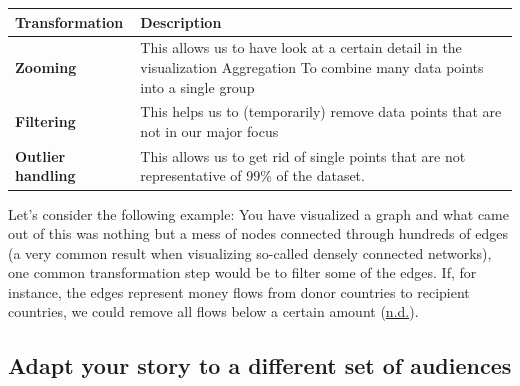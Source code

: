 \documentclass[]{book}
\begin{document}
\begin{longtable}[]{@{}ll@{}}
\toprule
\begin{minipage}[b]{0.15\columnwidth}\raggedright
\textbf{Transformation}\strut
\end{minipage} & \begin{minipage}[b]{0.79\columnwidth}\raggedright
\textbf{Description}\strut
\end{minipage}\tabularnewline
\midrule
\endhead
\begin{minipage}[t]{0.15\columnwidth}\raggedright
\textbf{Zooming}\strut
\end{minipage} & \begin{minipage}[t]{0.79\columnwidth}\raggedright
This allows us to have look at a certain detail in the visualization Aggregation To combine many data points into a single group\strut
\end{minipage}\tabularnewline
\begin{minipage}[t]{0.15\columnwidth}\raggedright
\textbf{Filtering}\strut
\end{minipage} & \begin{minipage}[t]{0.79\columnwidth}\raggedright
This helps us to (temporarily) remove data points that are not in our major focus\strut
\end{minipage}\tabularnewline
\begin{minipage}[t]{0.15\columnwidth}\raggedright
\textbf{Outlier handling}\strut
\end{minipage} & \begin{minipage}[t]{0.79\columnwidth}\raggedright
This allows us to get rid of single points that are not representative of 99\% of the dataset.\strut
\end{minipage}\tabularnewline
\bottomrule
\end{longtable}

Let's consider the following example: You have visualized a graph and what came out of this was nothing but a mess of nodes connected through hundreds of edges (a very common result when visualizing so-called densely connected networks), one common transformation step would be to filter some of the edges. If, for instance, the edges represent money flows from donor countries to recipient countries, we could remove all flows below a certain amount (\protect\hyperlink{ref-dataviz_bestprac}{n.d.}).

\hypertarget{adapt-your-story-to-a-different-set-of-audiences}{%
\subsection{Adapt your story to a different set of audiences}\label{adapt-your-story-to-a-different-set-of-audiences}}
\end{document}
